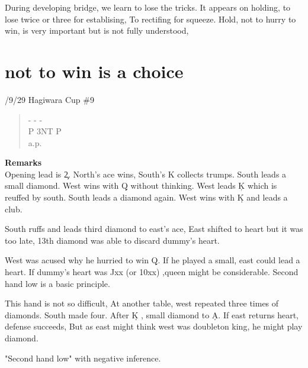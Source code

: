 During developing bridge, we learn to lose the tricks.
It appears on holding, to lose twice or three for establising, 
To rectifing for squeeze. Hold, not to hurry to win, is very
important but is not fully understood,

\section{not to win is a choice}
/9/29 Hagiwara Cup \#9
\begin{quote}
%
  {}%
  {}
  {}%
  {}%
\end{quote}
\begin{quote}
\begin{bidding}
- \> - \> - \s \\
P \> 3NT \> P \s \\
a.p.
\end{bidding}
\end{quote}
{\bf Remarks}\\

Opening lead is \c 2. North's ace wins, South's \s K collects trumps.
South leads a small diamond. West wins with \d Q without thinking.
West leads \c K which is reuffed by south. South leads a diamond 
again. West wins with \d K and leads a club.

South ruffs and leads third diamond to east's ace,
East shifted to heart but it was too late, 13th diamond 
was able to discard dummy's heart.

West was acused why he hurried to win \d Q. If he
played a small, east could lead a heart. If dummy's heart was 
Jxx (or 10xx) ,queen might be considerable. Second hand low is a
basic principle.

This hand is not so difficult, At another table, west repeated 
three times of diamonds. South made four.
 After \d K , small diamond to \d A. 
If east returns heart, defense succeeds, But as east might
think west was doubleton king, he might play diamond.

\vspace{0,5cm}

"Second hand low" with negative inference.\\


